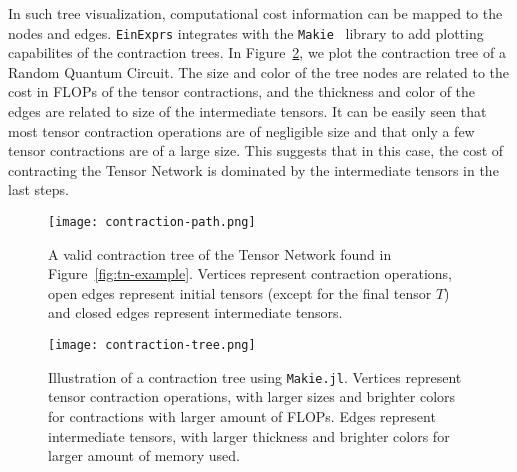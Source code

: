 \documentclass{juliacon}
\begin{document}
In such tree visualization, computational cost information can be mapped to the nodes and edges. 
\texttt{EinExprs} integrates with the \texttt{Makie}~\cite{DanischKrumbiegel2021} library to add plotting capabilites of the contraction trees.
In Figure~\ref{fig:contraction-tree:makie}, we plot the contraction tree of a Random Quantum Circuit.
The size and color of the tree nodes are related to the cost in FLOPs of the tensor contractions, and the thickness and color of the edges are related to size of the intermediate tensors.
It can be easily seen that most tensor contraction operations are of negligible size and that only a few tensor contractions are of a large size.
This suggests that in this case, the cost of contracting the Tensor Network is dominated by the intermediate tensors in the last steps.

\begin{figure}
    \centering
    \texttt{[image: contraction-path.png]}
    \caption{A valid contraction tree of the Tensor Network found in Figure~\ref{fig:tn-example}. Vertices represent contraction operations, open edges represent initial tensors (except for the final tensor $T$) and closed edges represent intermediate tensors.}
    \label{fig:contraction-tree}
\end{figure}

\begin{figure}
    \centering
    \texttt{[image: contraction-tree.png]}
    \caption{Illustration of a contraction tree using \texttt{Makie.jl}. Vertices represent tensor contraction operations, with larger sizes and brighter colors for contractions with larger amount of FLOPs. Edges represent intermediate tensors, with larger thickness and brighter colors for larger amount of memory used.}
    \label{fig:contraction-tree:makie}
\end{figure}
\end{document}

